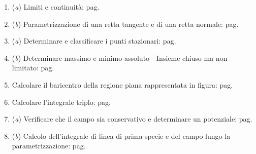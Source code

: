 \documentclass[a4paper]{article}
\begin{document}
\begin{itemize}
\begin{itemize}
\begin{itemize}
\begin{enumerate}[label*=Ex. \arabic*), leftmargin = 4em]
					\item (\emph{a}) Limiti e continuità: pag.~\hyperlink{
						exam: esame 06 settembre 2023 - Gruppo A - 4 esercizio (a)
					}{
					}

					\setcounter{enumi}{3}
					
					\item (\emph{b}) Parametrizzazione di una retta tangente e di una retta normale: pag.~\hyperlink{
						exam: esame 06 settembre 2023 - Gruppo A - 4 esercizio (b)
					}{
					}

					\item (\emph{a}) Determinare e classificare i punti stazionari:\newline%
					pag.~\hyperlink{
						exam: esame 06 settembre 2023 - Gruppo A - 5 esercizio (a)
					}{
					}

					\setcounter{enumi}{4}

					\item (\emph{b}) Determinare massimo e minimo assoluto - Insieme chiuso ma non limitato: pag.~\hyperlink{
						exam: esame 06 settembre 2023 - Gruppo A - 5 esercizio (b)
					}{
					}

					\item Calcolare il baricentro della regione piana rappresentata in figura: pag.~\hyperlink{
						exam: esame 06 settembre 2023 - Gruppo A - 6 esercizio
					}{
					}

					\item Calcolare l'integrale triplo: pag.~\hyperlink{
						exam: esame 06 settembre 2023 - Gruppo A - 7 esercizio
					}{
					}

					\item (\emph{a}) Verificare che il campo sia conservativo e determinare un potenziale: pag.~\hyperlink{
						exam: esame 06 settembre 2023 - Gruppo A - 8 esercizio (a)
					}{
					}

					\setcounter{enumi}{7}

					\item (\emph{b}) Calcolo dell'integrale di linea di prima specie e del campo lungo la parametrizzazione: pag.~\hyperlink{
						exam: esame 06 settembre 2023 - Gruppo A - 8 esercizio (b)
					}{
					}
				\end{enumerate}
			\end{itemize}
		\end{itemize}
	\end{itemize}
\end{document}

